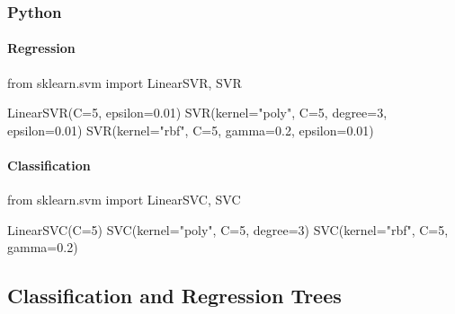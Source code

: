 \documentclass[
  letterpaper,
  DIV=11,
  numbers=noendperiod]{scrreprt}
\newenvironment{Shaded}{\begin{snugshade}}{\end{snugshade}}
\newcommand{\DecValTok}[1]{\textcolor[rgb]{0.68,0.00,0.00}{#1}}
\newcommand{\FloatTok}[1]{\textcolor[rgb]{0.68,0.00,0.00}{#1}}
\newcommand{\ImportTok}[1]{\textcolor[rgb]{0.00,0.46,0.62}{#1}}
\newcommand{\NormalTok}[1]{\textcolor[rgb]{0.00,0.46,0.62}{#1}}
\newcommand{\OperatorTok}[1]{\textcolor[rgb]{0.37,0.37,0.37}{#1}}
\newcommand{\StringTok}[1]{\textcolor[rgb]{0.13,0.47,0.30}{#1}}
\let\oldparagraph\paragraph
\renewcommand{\paragraph}[1]{\oldparagraph{#1}\mbox{}}
\begin{document}
\hypertarget{python-75}{%
\subsubsection{Python}\label{python-75}}

\hypertarget{regression-5}{%
\paragraph{Regression}\label{regression-5}}

\begin{Shaded}
\begin{Highlighting}[]
\ImportTok{from}\NormalTok{ sklearn.svm }\ImportTok{import}\NormalTok{ LinearSVR, SVR}

\NormalTok{LinearSVR(C}\OperatorTok{=}\DecValTok{5}\NormalTok{, epsilon}\OperatorTok{=}\FloatTok{0.01}\NormalTok{)}
\NormalTok{SVR(kernel}\OperatorTok{=}\StringTok{"poly"}\NormalTok{, C}\OperatorTok{=}\DecValTok{5}\NormalTok{, degree}\OperatorTok{=}\DecValTok{3}\NormalTok{, epsilon}\OperatorTok{=}\FloatTok{0.01}\NormalTok{)}
\NormalTok{SVR(kernel}\OperatorTok{=}\StringTok{"rbf"}\NormalTok{, C}\OperatorTok{=}\DecValTok{5}\NormalTok{, gamma}\OperatorTok{=}\FloatTok{0.2}\NormalTok{, epsilon}\OperatorTok{=}\FloatTok{0.01}\NormalTok{)}
\end{Highlighting}
\end{Shaded}

\hypertarget{classification-5}{%
\paragraph{Classification}\label{classification-5}}

\begin{Shaded}
\begin{Highlighting}[]
\ImportTok{from}\NormalTok{ sklearn.svm }\ImportTok{import}\NormalTok{ LinearSVC, SVC}

\NormalTok{LinearSVC(C}\OperatorTok{=}\DecValTok{5}\NormalTok{)}
\NormalTok{SVC(kernel}\OperatorTok{=}\StringTok{"poly"}\NormalTok{, C}\OperatorTok{=}\DecValTok{5}\NormalTok{, degree}\OperatorTok{=}\DecValTok{3}\NormalTok{)}
\NormalTok{SVC(kernel}\OperatorTok{=}\StringTok{"rbf"}\NormalTok{, C}\OperatorTok{=}\DecValTok{5}\NormalTok{, gamma}\OperatorTok{=}\FloatTok{0.2}\NormalTok{)}
\end{Highlighting}
\end{Shaded}

\hypertarget{classification-and-regression-trees}{%
\subsection{Classification and Regression
Trees}\label{classification-and-regression-trees}}
\end{document}
